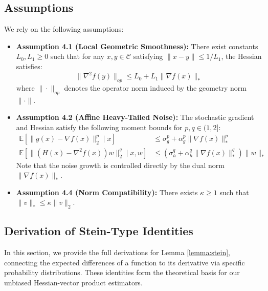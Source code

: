 \documentclass{article}
\theoremstyle{plain}
\theoremstyle{definition}
\theoremstyle{remark}
\begin{document}
\subsection{Assumptions}
We rely on the following assumptions:

\begin{itemize}
    \item \textbf{Assumption 4.1 (Local Geometric Smoothness):} There exist constants $L_0, L_1 \ge 0$ such that for any $x, y \in \mathcal{C}$ satisfying $\|x - y\| \le 1/L_1$, the Hessian satisfies:
    \begin{equation}
        \|\nabla^2 f(y)\|_{op} \le L_0 + L_1 \|\nabla f(x)\|_*
    \end{equation}
    where $\|\cdot\|_{op}$ denotes the operator norm induced by the geometry norm $\|\cdot\|$.

    \item \textbf{Assumption 4.2 (Affine Heavy-Tailed Noise):} The stochastic gradient and Hessian satisfy the following moment bounds for $p, q \in (1, 2]$:
    \begin{align}
        \mathbb{E}[\|g(x) - \nabla f(x)\|_2^p \mid x] &\le \sigma_g^p + \alpha_g^p \|\nabla f(x)\|_*^p \\
        \mathbb{E}[\|(H(x) - \nabla^2 f(x))w\|_2^q \mid x,w] &\le \left(\sigma_h^q + \alpha_h^q \|\nabla f(x)\|_*^q\right) \|w\|_*
    \end{align}
    Note that the noise growth is controlled directly by the dual norm $\|\nabla f(x)\|_*$.

    \item \textbf{Assumption 4.4 (Norm Compatibility):} There exists $\kappa \ge 1$ such that $\|v\|_* \le \kappa \|v\|_2$.
\end{itemize}


\subsection{Derivation of Stein-Type Identities}
\label{app:stein_derivations}

In this section, we provide the full derivations for Lemma \ref{lemma:stein}, connecting the expected differences of a function to its derivative via specific probability distributions. These identities form the theoretical basis for our unbiased Hessian-vector product estimators.
\end{document}
